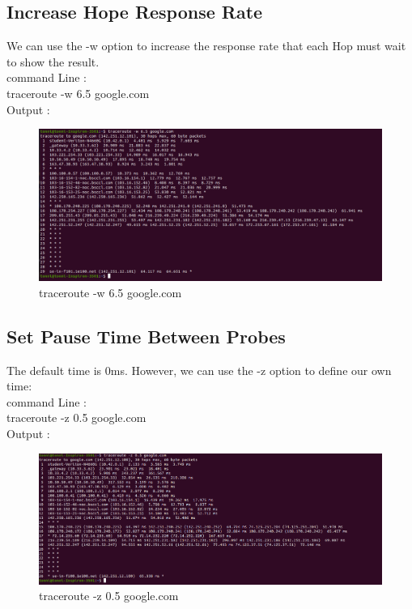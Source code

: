 \documentclass[11pt]{article}
\begin{document}
\subsection{Increase Hope Response Rate}
We can use the -w option to increase the response rate that each Hop must wait to show the result.\\[32pt]
command Line :\\[6pt]
  traceroute -w 6.5 google.com\\[92pt]   
        Output : 
  \begin{figure}[!h]
\centering
\includegraphics[width=\textwidth]{increase_trace.png}
\caption{traceroute -w 6.5 google.com}
\end{figure}

\subsection{Set Pause Time Between Probes}
The default time is 0ms. However, we can use the -z option to define our own time:\\[12pt]
command Line :\\[6pt]
  traceroute -z 0.5 google.com\\[12pt]   
        Output : 
  \begin{figure}[!h]
\centering
\includegraphics[width=\textwidth]{set_trace.png}
\caption{traceroute -z 0.5 google.com}
\end{figure}
\end{document}
